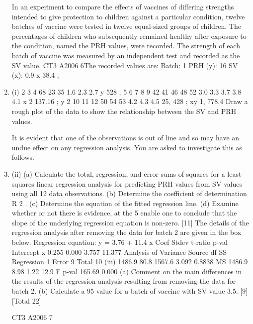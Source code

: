\documentclass[a4paper,12pt]{article}
\begin{document}
\begin{enumerate}
In an experiment to compare the effects of vaccines of differing strengths intended to
give protection to children against a particular condition, twelve batches of vaccine
were tested in twelve equal-sized groups of children. The percentages of children
who subsequently remained healthy after exposure to the condition, named the PRH
values, were recorded. The strength of each batch of vaccine was measured by an
independent test and recorded as the SV value.
CT3 A2006 6The recorded values are:
Batch:
1
PRH (y): 16
SV (x):
0.9
x 38.4 ;
\item (i)
2
3
4
68 23 35
1.6 2.3 2.7
y
528 ;
5
6
7
8
9
42 41 46 48 52
3.0 3.3 3.7 3.8 4.1
x 2 137.16 ;
y 2
10 11 12
50 54 53
4.2 4.3 4.5
25, 428 ;
xy 1, 778.4
Draw a rough plot of the data to show the relationship between the SV and
PRH values.

It is evident that one of the observations is out of line and so may have an undue
effect on any regression analysis. You are asked to investigate this as follows.
\item (ii)
(a) Calculate the total, regression, and error sums of squares for a least-
squares linear regression analysis for predicting PRH values from SV
values using all 12 data observations.
(b) Determine the coefficient of determination R 2 .
(c) Determine the equation of the fitted regression line.
(d) Examine whether or not there is evidence, at the 5%
enable one to conclude that the slope of the underlying regression
equation is non-zero.
[11]
The details of the regression analysis after removing the data for batch 2 are given in
the box below.
Regression equation: y = 3.76 + 11.4 x
Coef
Stdev
t-ratio p-val
Intercept
x 0.255
0.000
3.757
11.377
Analysis of Variance
Source
df
SS
Regression 1
Error
9
Total
10
(iii)
1486.9
80.8
1567.6
3.092
0.8838
MS
1486.9
8.98
1.22
12.9
F p-val
165.69 0.000
(a) Comment on the main differences in the results of the regression
analysis resulting from removing the data for batch 2.
(b) Calculate a 95%
value for a batch of vaccine with SV value 3.5.
[9]
[Total 22]

CT3 A2006 7


\end{enumerate}
\end{document}
